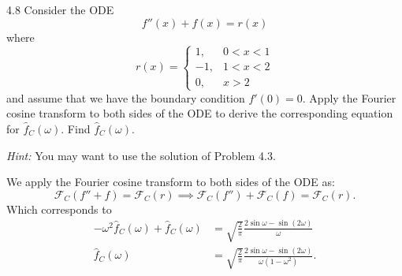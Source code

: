 

\begin{problem}{4.8}
Consider the ODE
\[ 
f''(x) + f(x) = r(x)
\]
where
\[ 
r(x) = \begin{cases}
1, & 0<x<1\\
-1, & 1<x<2 \\
0, & x > 2
\end{cases}
\]
and assume that we have the boundary condition $f'(0) = 0$.
Apply the Fourier cosine transform to both sides of the ODE to derive the corresponding equation for $\hat{f}_C (\omega)$.
Find $\hat{f}_C (\omega)$.

\textit{Hint:} You may want to use the solution of Problem 4.3.
\end{problem}

\begin{derivation}
  We apply the Fourier cosine transform to both sides of the ODE as:
  \begin{equation*}
    \mathcal{F}_C(f'' + f) = \mathcal{F}_C(r) \implies \mathcal{F}_C(f'') + \mathcal{F}_C(f) = \mathcal{F}_C(r)
  .\end{equation*}
  Which corresponds to
  \begin{align*}
    - \omega^2 \hat{f}_C(\omega) + \hat{f}_C(\omega) &= \sqrt{\frac{2}{\pi}} \frac{2 \sin \omega - \sin (2\omega)}{\omega} \\
    \hat{f}_C(\omega) &= \sqrt{\frac{2}{\pi}} \frac{2 \sin \omega - \sin (2\omega)}{\omega \left( 1 - \omega^2 \right)}
  .\end{align*}
\end{derivation}

